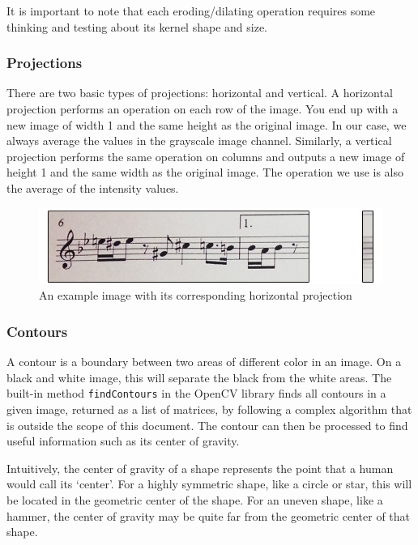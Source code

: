 It is important to note that each eroding/dilating operation requires some thinking and testing about its kernel shape and size.

\subsubsection{Projections} \label{sec:projections}

There are two basic types of projections: horizontal and vertical. A horizontal projection performs an operation on each row of the image. You end up with a new image of width 1 and the same height as the original image. In our case, we always average the values in the grayscale image channel.
Similarly, a vertical projection performs the same operation on columns and outputs a new image of height 1 and the same width as the original image. The operation we use is also the average of the intensity values.

\begin{figure}[h!]
	\centering
	\includegraphics[width=1\textwidth]{./assets/projectionBackground.png}
	\caption{An example image with its corresponding horizontal projection}
	\label{image:projectionBackground}
\end{figure}

\subsubsection{Contours} \label{sec:contour}

A contour is a boundary between two areas of different color in an image. On a black and white image, this will separate the black from the white areas. The built-in method \verb!findContours!\cite{findContours} in the OpenCV library finds all contours in a given image, returned as a list of matrices, by following a complex algorithm that is outside the scope of this document. The contour can then be processed to find useful information such as its center of gravity.

Intuitively, the center of gravity of a shape represents the point that a human would call its ‘center’. For a highly symmetric shape, like a circle or star, this will be located in the geometric center of the shape. For an uneven shape, like a hammer, the center of gravity may be quite far from the geometric center of that shape.

